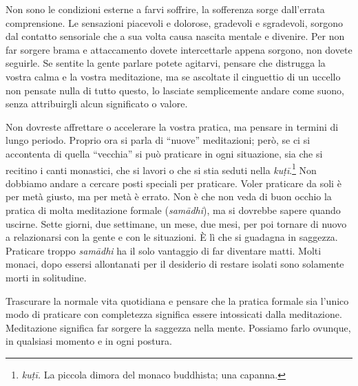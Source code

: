 Non sono le condizioni esterne a farvi soffrire, la sofferenza sorge
dall'errata comprensione. Le sensazioni piacevoli e dolorose, gradevoli
e sgradevoli, sorgono dal contatto sensoriale che a sua volta causa
nascita mentale e divenire. Per non far sorgere brama e attaccamento
dovete intercettarle appena sorgono, non dovete seguirle. Se sentite la
gente parlare potete agitarvi, pensare che distrugga la vostra calma e
la vostra meditazione, ma se ascoltate il cinguettio di un uccello non
pensate nulla di tutto questo, lo lasciate semplicemente andare come
suono, senza attribuirgli alcun significato o valore.

Non dovreste affrettare o accelerare la vostra pratica, ma pensare in
termini di lungo periodo. Proprio ora si parla di ``nuove'' meditazioni;
però, se ci si accontenta di quella ``vecchia'' si può praticare in ogni
situazione, sia che si recitino i canti monastici, che si lavori o che
si stia seduti nella \emph{kuṭī}.\footnote{\emph{kuṭī.} La piccola
  dimora del monaco buddhista; una capanna.} Non dobbiamo andare a
cercare posti speciali per praticare. Voler praticare da soli è per metà
giusto, ma per metà è errato. Non è che non veda di buon occhio la
pratica di molta meditazione formale (\emph{samādhi}), ma si dovrebbe
sapere quando uscirne. Sette giorni, due settimane, un mese, due mesi,
per poi tornare di nuovo a relazionarsi con la gente e con le
situazioni. È lì che si guadagna in saggezza. Praticare troppo
\emph{samādhi} ha il solo vantaggio di far diventare matti. Molti
monaci, dopo essersi allontanati per il desiderio di restare isolati
sono solamente morti in solitudine.

Trascurare la normale vita quotidiana e pensare che la pratica formale
sia l'unico modo di praticare con completezza significa essere
intossicati dalla meditazione. Meditazione significa far sorgere la
saggezza nella mente. Possiamo farlo ovunque, in qualsiasi momento e in
ogni postura.

